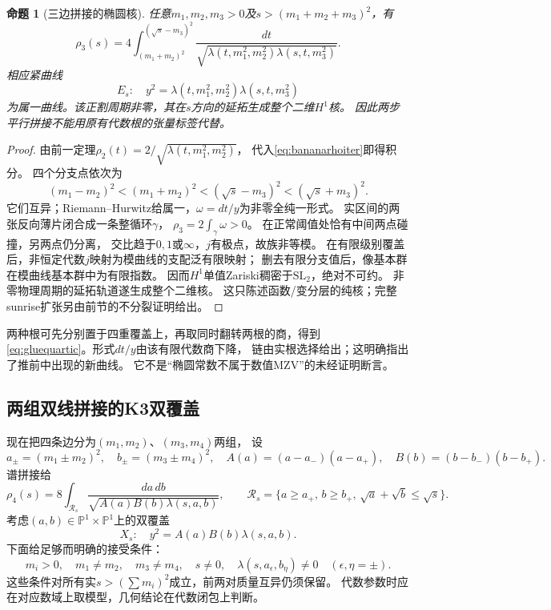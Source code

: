 \documentclass[11pt,a4paper]{ctexart}
\theoremstyle{cnplain}\newtheorem{theorem}{定理}[section]
\newtheorem{proposition}[theorem]{命题}
\theoremstyle{definition}\newtheorem{definition}[theorem]{定义}
\theoremstyle{remark}\newtheorem{remark}[theorem]{注}
\begin{document}
\begin{proposition}[三边拼接的椭圆核]\label{prop:glueelliptic}
任意$m_1,m_2,m_3>0$及$s>(m_1+m_2+m_3)^2$，有
\[
 \rho_3(s)=4\int_{(m_1+m_2)^2}^{(\sqrt s-m_3)^2}
 \frac{dt}{\sqrt{\lambda(t,m_1^2,m_2^2)\lambda(s,t,m_3^2)}} .
\]
相应紧曲线
\begin{equation}\label{eq:gluequartic}
 E_s:\quad y^2=\lambda(t,m_1^2,m_2^2)\lambda(s,t,m_3^2)
\end{equation}
为属一曲线。该正割周期非零，其在$s$方向的延拓生成整个二维$H^1$核。
因此两步平行拼接不能用原有代数根的张量标签代替。
\end{proposition}
\begin{proof}
由前一定理$\rho_2(t)=2/\sqrt{\lambda(t,m_1^2,m_2^2)}$，
代入\eqref{eq:bananarhoiter}即得积分。
四个分支点依次为
\[
 (m_1-m_2)^2<(m_1+m_2)^2<(\sqrt s-m_3)^2<(\sqrt s+m_3)^2 .
\]
它们互异；Riemann--Hurwitz给属一，$\omega=dt/y$为非零全纯一形式。
实区间的两张反向薄片闭合成一条整循环$\gamma$，
$\rho_3=2\int_\gamma\omega>0$。
在正常阈值处恰有中间两点碰撞，另两点仍分离，
交比趋于$0,1$或$\infty$，$j$有极点，故族非等模。
在有限级别覆盖后，非恒定代数$j$映射为模曲线的支配泛有限映射；
删去有限分支值后，像基本群在模曲线基本群中为有限指数。
因而$H^1$单值Zariski稠密于$\mathrm{SL}_2$，绝对不可约。
非零物理周期的延拓轨道遂生成整个二维核。
这只陈述函数/变分层的纯核；完整sunrise扩张另由前节的不分裂证明给出。
\end{proof}

两种根可先分别置于四重覆盖上，再取同时翻转两根的商，得到
\eqref{eq:gluequartic}。形式$dt/y$由该有限代数商下降，
链由实根选择给出；这明确指出了推前中出现的新曲线。
它不是“椭圆常数不属于数值MZV”的未经证明断言。

\subsection{两组双线拼接的K3双覆盖}
现在把四条边分为$(m_1,m_2)$、$(m_3,m_4)$两组，
设
\[
 a_\pm=(m_1\pm m_2)^2,\quad b_\pm=(m_3\pm m_4)^2,\quad
 A(a)=(a-a_-)(a-a_+),\quad B(b)=(b-b_-)(b-b_+).
\]
谱拼接给
\begin{equation}\label{eq:rho4surface}
 \rho_4(s)=8\int_{\mathcal R_s}
 \frac{da\,db}{\sqrt{A(a)B(b)\lambda(s,a,b)}},\qquad
 \mathcal R_s=\{a\ge a_+,\,b\ge b_+,\,\sqrt a+\sqrt b\le\sqrt s\}.
\end{equation}
考虑$(a,b)\in\mathbb P^1\times\mathbb P^1$上的双覆盖
\begin{equation}\label{eq:spectralk3}
              X_s:\quad y^2=A(a)B(b)\lambda(s,a,b).
\end{equation}
下面给足够而明确的接受条件：
\begin{equation}\label{eq:k3accept}
 m_i>0,\quad m_1\ne m_2,\quad m_3\ne m_4,\quad s\ne0,\quad
 \lambda(s,a_\epsilon,b_\eta)\ne0\quad(\epsilon,\eta=\pm).
\end{equation}
这些条件对所有实$s>(\sum m_i)^2$成立，前两对质量互异仍须保留。
代数参数时应在对应数域上取模型，几何结论在代数闭包上判断。
\end{document}
